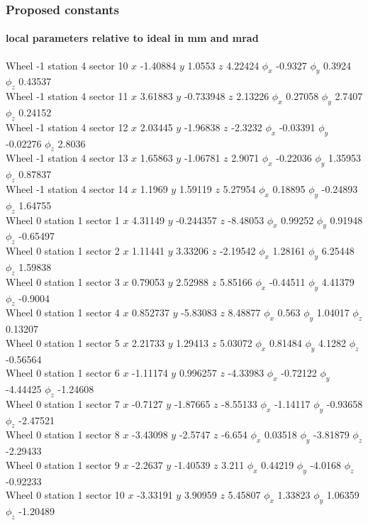 \documentclass[compress]{beamer}
\begin{document}
\begin{frame}
\frametitle{Proposed constants}
\framesubtitle{local parameters relative to ideal in mm and mrad}

\tiny

Wheel -1 station 4 sector 10 $x$ -1.40884 $y$ 1.0553 $z$ 4.22424 $\phi_x$ -0.9327 $\phi_y$ 0.3924 $\phi_z$ 0.43537 \\
Wheel -1 station 4 sector 11 $x$ 3.61883 $y$ -0.733948 $z$ 2.13226 $\phi_x$ 0.27058 $\phi_y$ 2.7407 $\phi_z$ 0.24152 \\
Wheel -1 station 4 sector 12 $x$ 2.03445 $y$ -1.96838 $z$ -2.3232 $\phi_x$ -0.03391 $\phi_y$ -0.02276 $\phi_z$ 2.8036 \\
Wheel -1 station 4 sector 13 $x$ 1.65863 $y$ -1.06781 $z$ 2.9071 $\phi_x$ -0.22036 $\phi_y$ 1.35953 $\phi_z$ 0.87837 \\
Wheel -1 station 4 sector 14 $x$ 1.1969 $y$ 1.59119 $z$ 5.27954 $\phi_x$ 0.18895 $\phi_y$ -0.24893 $\phi_z$ 1.64755 \\
Wheel 0 station 1 sector 1 $x$ 4.31149 $y$ -0.244357 $z$ -8.48053 $\phi_x$ 0.99252 $\phi_y$ 0.91948 $\phi_z$ -0.65497 \\
Wheel 0 station 1 sector 2 $x$ 1.11441 $y$ 3.33206 $z$ -2.19542 $\phi_x$ 1.28161 $\phi_y$ 6.25448 $\phi_z$ 1.59838 \\
Wheel 0 station 1 sector 3 $x$ 0.79053 $y$ 2.52988 $z$ 5.85166 $\phi_x$ -0.44511 $\phi_y$ 4.41379 $\phi_z$ -0.9004 \\
Wheel 0 station 1 sector 4 $x$ 0.852737 $y$ -5.83083 $z$ 8.48877 $\phi_x$ 0.563 $\phi_y$ 1.04017 $\phi_z$ 0.13207 \\
Wheel 0 station 1 sector 5 $x$ 2.21733 $y$ 1.29413 $z$ 5.03072 $\phi_x$ 0.81484 $\phi_y$ 4.1282 $\phi_z$ -0.56564 \\
Wheel 0 station 1 sector 6 $x$ -1.11174 $y$ 0.996257 $z$ -4.33983 $\phi_x$ -0.72122 $\phi_y$ -4.44425 $\phi_z$ -1.24608 \\
Wheel 0 station 1 sector 7 $x$ -0.7127 $y$ -1.87665 $z$ -8.55133 $\phi_x$ -1.14117 $\phi_y$ -0.93658 $\phi_z$ -2.47521 \\
Wheel 0 station 1 sector 8 $x$ -3.43098 $y$ -2.5747 $z$ -6.654 $\phi_x$ 0.03518 $\phi_y$ -3.81879 $\phi_z$ -2.29433 \\
Wheel 0 station 1 sector 9 $x$ -2.2637 $y$ -1.40539 $z$ 3.211 $\phi_x$ 0.44219 $\phi_y$ -4.0168 $\phi_z$ -0.92233 \\
Wheel 0 station 1 sector 10 $x$ -3.33191 $y$ 3.90959 $z$ 5.45807 $\phi_x$ 1.33823 $\phi_y$ 1.06359 $\phi_z$ -1.20489 \\

\end{frame}
\end{document}
